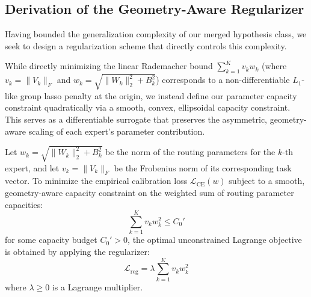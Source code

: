 \subsection{Derivation of the Geometry-Aware Regularizer}
Having bounded the generalization complexity of our merged hypothesis class, we seek to design a regularization scheme that directly controls this complexity. 

While directly minimizing the linear Rademacher bound $\sum_{k=1}^K v_k w_k$ (where $v_k = \|V_k\|_F$ and $w_k = \sqrt{\|W_k\|_2^2 + B_k^2}$) corresponds to a non-differentiable $L_1$-like group lasso penalty at the origin, we instead define our parameter capacity constraint quadratically via a smooth, convex, ellipsoidal capacity constraint. This serves as a differentiable surrogate that preserves the asymmetric, geometry-aware scaling of each expert's parameter contribution.

\begin{theorem}
Let $w_k = \sqrt{\|W_k\|_2^2 + B_k^2}$ be the norm of the routing parameters for the $k$-th expert, and let $v_k = \|V_k\|_F$ be the Frobenius norm of its corresponding task vector. To minimize the empirical calibration loss $\mathcal{L}_{\text{CE}}(w)$ subject to a smooth, geometry-aware capacity constraint on the weighted sum of routing parameter capacities:
\begin{equation}
    \sum_{k=1}^K v_k w_k^2 \le C_0'
\end{equation}
for some capacity budget $C_0' > 0$, the optimal unconstrained Lagrange objective is obtained by applying the regularizer:
\begin{equation}
    \mathcal{L}_{\text{reg}} = \lambda \sum_{k=1}^K v_k w_k^2
\end{equation}
where $\lambda \ge 0$ is a Lagrange multiplier.
\end{theorem}

